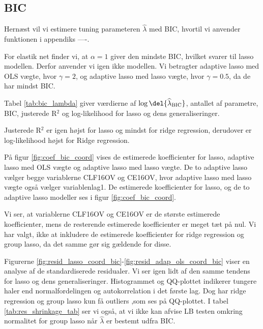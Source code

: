 \subsection{BIC}
Hernæst vil vi estimere tuning parameteren \(\widehat{\lambda}\) med BIC, hvortil vi anvender funktionen i appendiks ----.

For elastik net finder vi, at $\alpha = 1$ giver den mindste BIC, hvilket svarer til lasso modellen. Derfor anvender vi igen ikke modellen. 
Vi betragter adaptive lasso med OLS vægte, hvor $\gamma = 2$, og adaptive lasso med lasso vægte, hvor $\gamma = 0.5$, da de har mindst BIC. 

Tabel \ref{tab:bic_lambda} giver værdierne af $\log \del{ \widehat{\lambda}_\text{BIC}}$, antallet af parametre, BIC, justerede R$^2$ og log-likelihood for lasso og dens generaliseringer. 

Justerede R$^2$ er igen højst for  lasso og mindst for ridge regression, derudover er log-likelihood højst for Ridge regression. 



På figur \ref{fig:coef_bic_coord} vises de estimerede koefficienter for lasso, adaptive lasso med OLS vægte og adaptive lasso med lasso vægte.
De to adaptive lasso vælger begge variablerne  \textcolor{blue3}{CLF16OV} og \textcolor{blue3}{CE16OV}, hvor adaptive lasso med lasso vægte også vælger variablen\textcolor{blue3}{lag1}. 
De estimerede koefficienter for lasso, og de to adaptive lasso modeller ses i figur \ref{fig:coef_bic_coord}. 

 
Vi ser, at variablerne \textcolor{blue3}{CLF16OV} og \textcolor{blue3}{CE16OV} er de største estimerede koefficienter, mens de resterende estimerede koefficienter er meget tæt på nul. 
Vi har valgt, ikke at inkludere de estimerede koefficienter for ridge regression og group lasso, da det samme gør sig gældende for disse.


Figurerne \ref{fig:resid_lasso_coord_bic}-\ref{fig:resid_adap_ols_coord_bic} viser en analyse af de standardiserede residualer.
Vi ser igen lidt af den samme tendens for lasso og dens generaliseringer. 
Histogrammet og QQ-plottet indikerer tungere haler end normalfordelingen og autokorrelation i det første lag. 
Dog har ridge regression og group lasso kun få outliers ,som ses på QQ-plottet. 
I tabel \ref{tab:res_shrinkage_tab} ser vi også, at vi ikke kan afvise LB testen omkring normalitet for group lasso når $\widehat{\lambda}$ er bestemt udfra BIC. 

